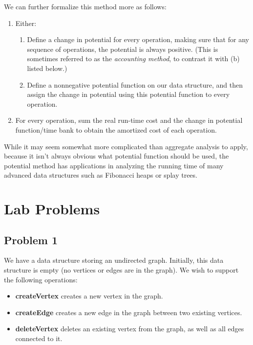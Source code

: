 We can further formalize this method more as follows:

\begin{enumerate}
  \item Either:
    \begin{enumerate}
      \item Define a change in potential for every operation, making sure that for any sequence of operations, the potential is always positive. (This is sometimes referred to as the \textit{accounting method}, to contrast it with (b) listed below.)
      \item Define a nonnegative potential function on our data structure, and then assign the change in potential using this potential function to every operation.
    \end{enumerate}
  \item For every operation, sum the real run-time cost and the change in potential function/time bank to obtain the amortized cost of each operation.
\end{enumerate}

While it may seem somewhat more complicated than aggregate analysis to apply, because it isn't always obvious what potential function should be used, the potential method has applications in analyzing the running time of many advanced data structures such as Fibonacci heaps or splay trees.

\section*{Lab Problems}

\subsection*{Problem 1}
We have a data structure storing an undirected graph. Initially, this data structure is empty (no vertices or edges are in the graph). We wish to support the following operations:

\begin{itemize}
  \item \textbf{createVertex} creates a new vertex in the graph.
  \item \textbf{createEdge} creates a new edge in the graph between two existing vertices.
  \item \textbf{deleteVertex} deletes an existing vertex from the graph, as well as all edges connected to it.
\end{itemize}

